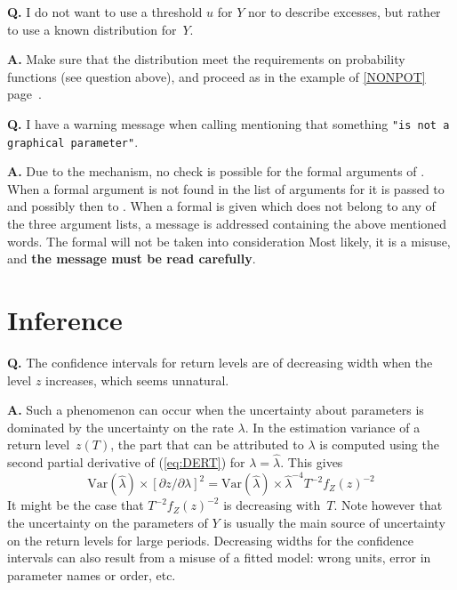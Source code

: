 \documentclass[11pt,a4paper]{report}\usepackage[]{graphicx}\usepackage[]{color}
\newcommand{\Var}{\textrm{Var}}
\begin{document}
\par\medskip\noindent
\textbf{Q.} I do not want to use a threshold $u$ for $Y$ nor to describe
excesses, but rather to use a known distribution for~$Y$.
\par\medskip\noindent
\textbf{A.}
Make sure that the distribution meet the requirements on probability 
functions (see question above), and proceed as in the example
of \ref{NONPOT} page~\pageref{NONPOT}.
\par\medskip\noindent
\textbf{Q.} I have a warning message when calling \verb@convSL@ mentioning that
something \texttt{"is not a graphical parameter"}.
\par\medskip\noindent
\textbf{A.}  Due to the \verb@dots@ mechanism, no check is possible
for the formal arguments of \verb@convSL@. When a formal argument is not
found in the list of arguments for \verb@convSL@ it is passed to
\verb@RSLplot@ and possibly then to \verb@plot@.  When a formal is
given which does not belong to any of the three argument lists, a
message is addressed containing the above mentioned words. The formal will not be taken
into consideration Most likely, it is a misuse, and \textbf{the message 
must be read carefully}.



\section{Inference}
\noindent
\textbf{Q.} The confidence intervals for return levels are of decreasing width 
when the level $z$ increases, which seems unnatural.
\par\medskip\noindent
\textbf{A.} Such a phenomenon can occur when the uncertainty about parameters is dominated
by the uncertainty on the rate $\lambda$. In the estimation variance of a return
level~$z(T)$, the part that can be attributed to $\lambda$ is computed using the
second partial derivative of (\ref{eq:DERT}) for  $\lambda =\widehat{\lambda}$. This gives
$$
    \Var( \widehat{\lambda} ) \times [ \partial z /\partial \lambda ]^2  =
   \Var( \widehat{\lambda} ) \times \widehat{\lambda}^{-4} T^{-2} f_Z(z)^{-2} 
$$
It might be the case that $T^{-2} f_Z(z)^{-2}$ is decreasing with~$T$. 
Note however that the uncertainty on the parameters of $Y$ is
usually the main source of uncertainty on the return levels for large
periods. Decreasing widths for the confidence intervals can also
result from a misuse of a fitted model: wrong units, error in
parameter names or order, etc.
\end{document}
